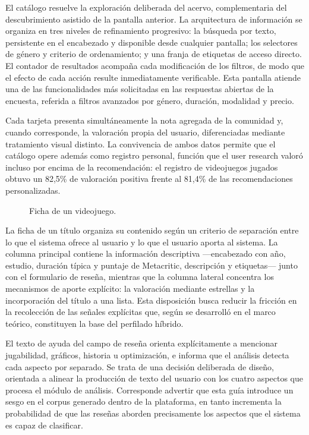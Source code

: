 El catálogo resuelve la exploración deliberada del acervo, complementaria del descubrimiento asistido de la pantalla anterior. La arquitectura de información se organiza en tres niveles de refinamiento progresivo: la búsqueda por texto, persistente en el encabezado y disponible desde cualquier pantalla; los selectores de género y criterio de ordenamiento; y una franja de etiquetas de acceso directo. El contador de resultados acompaña cada modificación de los filtros, de modo que el efecto de cada acción resulte inmediatamente verificable. Esta pantalla atiende una de las funcionalidades más solicitadas en las respuestas abiertas de la encuesta, referida a filtros avanzados por género, duración, modalidad y precio.

Cada tarjeta presenta simultáneamente la nota agregada de la comunidad y, cuando corresponde, la valoración propia del usuario, diferenciadas mediante tratamiento visual distinto. La convivencia de ambos datos permite que el catálogo opere además como registro personal, función que el user research valoró incluso por encima de la recomendación: el registro de videojuegos jugados obtuvo un 82,5\% de valoración positiva frente al 81,4\% de las recomendaciones personalizadas.

\begin{figure}[ht]
	\centering
	\caption{Ficha de un videojuego.}
	\label{fig:ui-detalle}
\end{figure}

La ficha de un título organiza su contenido según un criterio de separación entre lo que el sistema ofrece al usuario y lo que el usuario aporta al sistema. La columna principal contiene la información descriptiva —encabezado con año, estudio, duración típica y puntaje de Metacritic, descripción y etiquetas— junto con el formulario de reseña, mientras que la columna lateral concentra los mecanismos de aporte explícito: la valoración mediante estrellas y la incorporación del título a una lista. Esta disposición busca reducir la fricción en la recolección de las señales explícitas que, según se desarrolló en el marco teórico, constituyen la base del perfilado híbrido.

El texto de ayuda del campo de reseña orienta explícitamente a mencionar jugabilidad, gráficos, historia u optimización, e informa que el análisis detecta cada aspecto por separado. Se trata de una decisión deliberada de diseño, orientada a alinear la producción de texto del usuario con los cuatro aspectos que procesa el módulo de análisis. Corresponde advertir que esta guía introduce un sesgo en el corpus generado dentro de la plataforma, en tanto incrementa la probabilidad de que las reseñas aborden precisamente los aspectos que el sistema es capaz de clasificar.

